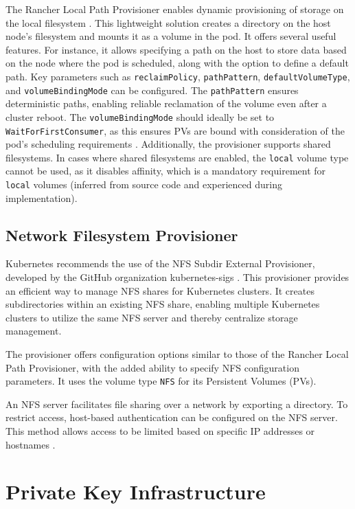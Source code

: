 The Rancher Local Path Provisioner enables dynamic provisioning of storage on the local filesystem \Parencite{rancher_local_path_provisioner}. This lightweight solution creates a directory on the host node's filesystem and mounts it as a volume in the pod. It offers several useful features. For instance, it allows specifying a path on the host to store data based on the node where the pod is scheduled, along with the option to define a default path. Key parameters such as \texttt{reclaimPolicy}, \texttt{pathPattern}, \texttt{defaultVolumeType}, and \texttt{volumeBindingMode} can be configured. The \texttt{pathPattern} ensures deterministic paths, enabling reliable reclamation of the volume even after a cluster reboot. The \texttt{volumeBindingMode} should ideally be set to \texttt{WaitForFirstConsumer}, as this ensures PVs are bound with consideration of the pod's scheduling requirements \Parencite{kubernetes_storage_classes}. Additionally, the provisioner supports shared filesystems. In cases where shared filesystems are enabled, the \texttt{local} volume type cannot be used, as it disables affinity, which is a mandatory requirement for \texttt{local} volumes (inferred from source code and experienced during implementation).

\subsection{Network Filesystem Provisioner} 

Kubernetes recommends the use of the NFS Subdir External Provisioner, developed by the GitHub organization kubernetes-sigs \Parencite{kubernetes_storage_classes_nfs}. This provisioner provides an efficient way to manage NFS shares for Kubernetes clusters. It creates subdirectories within an existing NFS share, enabling multiple Kubernetes clusters to utilize the same NFS server and thereby centralize storage management.

The provisioner offers configuration options similar to those of the Rancher Local Path Provisioner, with the added ability to specify NFS configuration parameters. It uses the volume type \texttt{NFS} for its Persistent Volumes (PVs).

An NFS server facilitates file sharing over a network by exporting a directory. To restrict access, host-based authentication can be configured on the NFS server. This method allows access to be limited based on specific IP addresses or hostnames \Parencite{ubuntu_nfs_setup}.

\section{Private Key Infrastructure}

